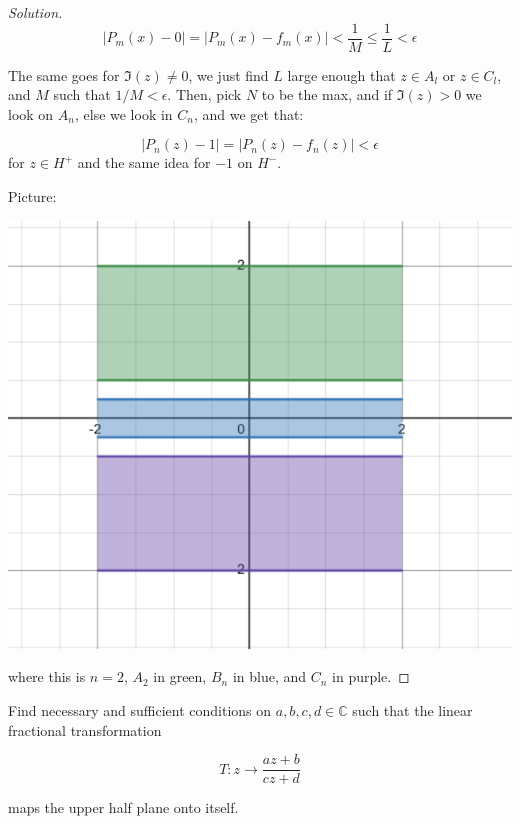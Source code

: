 \documentclass[10pt]{article}
\newenvironment{problem}[2][]{\begin{trivlist}
\item[\hskip \labelsep {\bfseries #1}\hskip \labelsep {\bfseries #2.}]}{\end{trivlist}}
\begin{document}
\begin{proof}[Solution]
$$ |P_m(x) - 0 | = |P_m(x) - f_m(x) | < \frac{1}{M} \leq \frac{1}{L} < \epsilon $$

The same goes for $\Im(z) \not = 0$, we just find $L$ large enough that $z \in A_l$ or $z \in C_l$, and $M$ such that $1/M < \epsilon$. Then, pick $N$ to be the max, and if $\Im(z) > 0$ we look on $A_n$, else we look in $C_n$, and we get that:

$$ | P_n(z) - 1 | = | P_n(z) - f_n(z) | < \epsilon $$ for $z \in H^+$ and the same idea for $-1$ on $H^-$.

Picture:

\begin{center}
\includegraphics[width=\linewidth]{partial_boxes}
\end{center}

where this is $n = 2$, $A_2$ in green, $B_n$ in blue, and $C_n$ in purple.

\end{proof}
  

\begin{problem}{Question 5}

Find necessary and sufficient conditions on $a,b,c,d \in \mathbb{C}$ such that the linear fractional transformation 

$$T: z \to \frac{az + b}{cz + d}$$

maps the upper half plane onto itself.

\end{problem}
\end{document}
